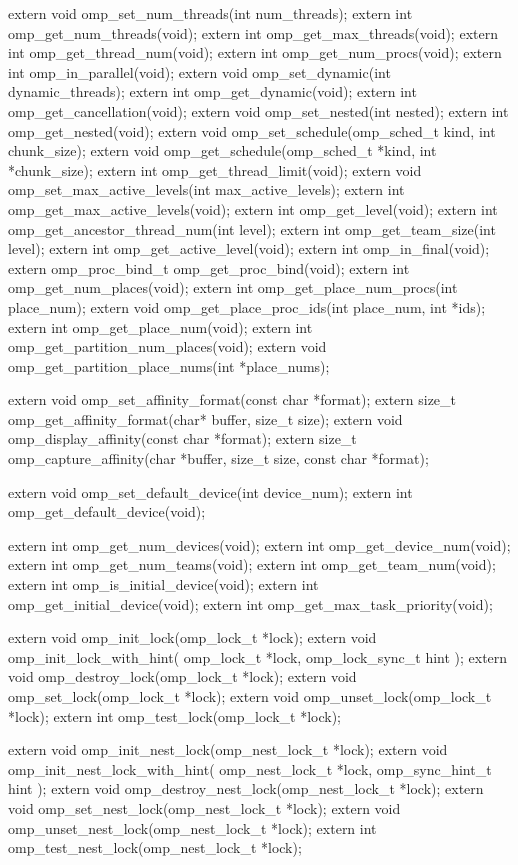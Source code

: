{\begin{ompcFunction}
{extern void omp_set_num_threads(int num_threads);
extern int omp_get_num_threads(void);
extern int omp_get_max_threads(void);
extern int omp_get_thread_num(void);
extern int omp_get_num_procs(void);
extern int omp_in_parallel(void);
extern void omp_set_dynamic(int dynamic_threads);
extern int omp_get_dynamic(void);
extern int omp_get_cancellation(void);
extern void omp_set_nested(int nested);
extern int omp_get_nested(void);
extern void omp_set_schedule(omp_sched_t kind, int chunk_size);
extern void omp_get_schedule(omp_sched_t *kind, int *chunk_size);
extern int omp_get_thread_limit(void);
extern void omp_set_max_active_levels(int max_active_levels);
extern int omp_get_max_active_levels(void);
extern int omp_get_level(void);
extern int omp_get_ancestor_thread_num(int level);
extern int omp_get_team_size(int level);
extern int omp_get_active_level(void);
extern int omp_in_final(void);
extern omp_proc_bind_t omp_get_proc_bind(void);
extern int omp_get_num_places(void);
extern int omp_get_place_num_procs(int place_num);
extern void omp_get_place_proc_ids(int place_num, int *ids);
extern int omp_get_place_num(void);
extern int omp_get_partition_num_places(void);
extern void omp_get_partition_place_nums(int *place_nums);

extern void omp_set_affinity_format(const char *format);
extern size_t omp_get_affinity_format(char* buffer, size_t size);
extern void omp_display_affinity(const char *format);
extern size_t omp_capture_affinity(char *buffer, size_t size, const char *format);

extern void omp_set_default_device(int device_num);
extern int omp_get_default_device(void);

extern int omp_get_num_devices(void);
extern int omp_get_device_num(void);
extern int omp_get_num_teams(void);
extern int omp_get_team_num(void);
extern int omp_is_initial_device(void);
extern int omp_get_initial_device(void);
extern int omp_get_max_task_priority(void);

extern void omp_init_lock(omp_lock_t *lock);
extern void omp_init_lock_with_hint(
  omp_lock_t *lock,
  omp_lock_sync_t hint
);
extern void omp_destroy_lock(omp_lock_t *lock);
extern void omp_set_lock(omp_lock_t *lock);
extern void omp_unset_lock(omp_lock_t *lock);
extern int omp_test_lock(omp_lock_t *lock);

extern void omp_init_nest_lock(omp_nest_lock_t *lock);
extern void omp_init_nest_lock_with_hint(
  omp_nest_lock_t *lock,
  omp_sync_hint_t hint
);
extern void omp_destroy_nest_lock(omp_nest_lock_t *lock);
extern void omp_set_nest_lock(omp_nest_lock_t *lock);
extern void omp_unset_nest_lock(omp_nest_lock_t *lock);
extern int omp_test_nest_lock(omp_nest_lock_t *lock);

}
\end{ompcFunction}}
